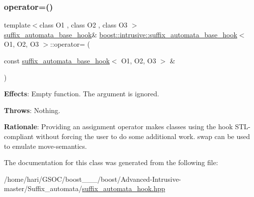 \subsubsection{\texorpdfstring{operator=()}{operator=()}}
{\footnotesize\ttfamily template$<$class O1 , class O2 , class O3 $>$ \\
\hyperlink{classboost_1_1intrusive_1_1suffix__automata__base__hook}{suffix\+\_\+automata\+\_\+base\+\_\+hook}\& \hyperlink{classboost_1_1intrusive_1_1suffix__automata__base__hook}{boost\+::intrusive\+::suffix\+\_\+automata\+\_\+base\+\_\+hook}$<$ O1, O2, O3 $>$\+::operator= (\begin{DoxyParamCaption}\item[{const \hyperlink{classboost_1_1intrusive_1_1suffix__automata__base__hook}{suffix\+\_\+automata\+\_\+base\+\_\+hook}$<$ O1, O2, O3 $>$ \&}]{ }\end{DoxyParamCaption})}

{\bfseries Effects}\+: Empty function. The argument is ignored.

{\bfseries Throws}\+: Nothing.

{\bfseries Rationale}\+: Providing an assignment operator makes classes using the hook S\+T\+L-\/compliant without forcing the user to do some additional work. {\ttfamily swap} can be used to emulate move-\/semantics. 

The documentation for this class was generated from the following file\+:\begin{DoxyCompactItemize}
\item 
/home/hari/\+G\+S\+O\+C/boost\+\_\+\_\+\_/boost/\+Advanced-\/\+Intrusive-\/master/\+Suffix\+\_\+automata/\hyperlink{suffix__automata__hook_8hpp}{suffix\+\_\+automata\+\_\+hook.\+hpp}\end{DoxyCompactItemize}
